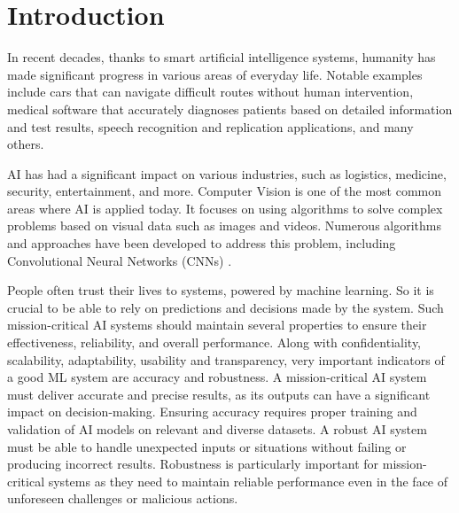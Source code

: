\documentclass[14pt,a4paper]{extarticle}
\newcounter{e}
\newcounter{tabl}
\numberwithin{equation}{section}
\numberwithin{figure}{section}
\begin{document}
 \newpage
 \thispagestyle{empty}
 \section*{Introduction}
 \begin{center}\end{center}

In recent decades, thanks to smart artificial intelligence systems, humanity has made significant progress in various areas of everyday life. Notable examples include cars that can navigate difficult routes without human intervention, medical software that accurately diagnoses patients based on detailed information and test results, speech recognition and replication applications, and many others.

AI has had a significant impact on various industries, such as logistics, medicine, security, entertainment, and more. Computer Vision is one of the most common areas where AI is applied today. It focuses on using algorithms to solve complex problems based on visual data such as images and videos. Numerous algorithms and approaches have been developed to address this problem, including Convolutional Neural Networks (CNNs) \cite{od-overview}.

People often trust their lives to systems, powered by machine learning. So it is crucial to be able to rely on predictions and decisions made by the system. Such mission-critical AI systems should maintain several properties to ensure their effectiveness, reliability, and overall performance. Along with confidentiality, scalability, adaptability, usability and transparency, very important indicators of a good ML system are accuracy and robustness. A mission-critical AI system must deliver accurate and precise results, as its outputs can have a significant impact on decision-making. Ensuring accuracy requires proper training and validation of AI models on relevant and diverse datasets. A robust AI system must be able to handle unexpected inputs or situations without failing or producing incorrect results. Robustness is particularly important for mission-critical systems as they need to maintain reliable performance even in the face of unforeseen challenges or malicious actions.
\end{document}
